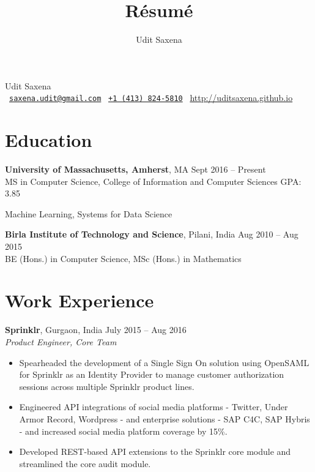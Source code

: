 \documentclass[letterpaper]{article}
\title{R\'esum\'e}
\author{Udit Saxena}
\begin{document}
\pagecolor{white}
\begin{center}
\huge
Udit Saxena\\
\small
\faEnvelope~\href{mailto:saxena.udit@gmail.com}{\nolinkurl{saxena.udit@gmail.com}}
\faPhone~\href{tel:14138245810}{\texttt{+1 (413) 824-5810}}
\faGlobe~\url{http://uditsaxena.github.io}
\normalsize
\end{center}

\section*{Education}
\vspace{-1mm}
\textbf{University of Massachusetts, Amherst}, MA \hfill Sept 2016 --
    Present\\
MS in Computer Science, College of Information and Computer Sciences \hfill GPA: 3.85
\vspace{-2mm}
\begin{description}[leftmargin=!, labelwidth=\widthof{Coursework },
        font=\normalfont]   
    \item[Coursework:] Machine Learning,
                        Systems for Data Science
\end{description}
\vspace{-0.5mm}
\textbf{Birla Institute of Technology and Science}, Pilani, India \hfill
    Aug 2010 -- Aug 2015\\
BE (Hons.) in Computer Science,
MSc (Hons.) in Mathematics

\section*{Work Experience}
\textbf{Sprinklr}, Gurgaon, India \hfill July 2015 -- Aug 2016\\
\emph{Product Engineer, Core Team}\\
\vspace{-6mm}
\begin{itemize}
\item Spearheaded the development of a Single Sign On solution using OpenSAML for Sprinklr as an Identity Provider to manage customer authorization sessions across multiple Sprinklr product lines.
\vspace{-2mm}
\item Engineered API integrations of  social media platforms - Twitter, Under Armor Record, Wordpress - and enterprise solutions - SAP C4C, SAP Hybris - and increased social media platform coverage by 15\%. 
\vspace{-2mm}
\item Developed REST-based API extensions to the Sprinklr core module and streamlined the core audit module.
\end{itemize}
\end{document}
